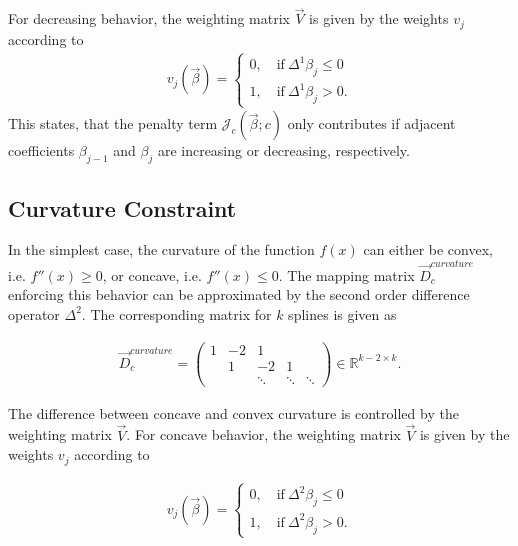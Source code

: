 \documentclass[10pt,a4paper]{article}
\begin{document}
	For decreasing behavior, the weighting matrix $\vec{V}$ is given by the weights $v_j$ according to
	\begin{align} \label{eq:v_monoton_dec}
		v_j(\vec{\beta}) = \begin{cases} 0, \quad \text{if} \ \Delta^1\beta_j \le 0 \\ 
						    					1, \quad \text{if} \ \Delta^1\beta_j > 0.
			\end{cases}	
	\end{align}
	This states, that the penalty term $\mathcal{J}_c(\vec{\beta}; c)$ only contributes if adjacent coefficients $\beta_{j-1}$ and $\beta_j$ are increasing or decreasing, respectively. \cite{hofner2011monotonicity} \cite{eilers2005unimodal}

	\subsection{Curvature Constraint}
	
	In the simplest case, the curvature of the function $f(x)$ can either be convex, i.e. $f''(x) \ge 0$, or concave, i.e. $f''(x) \le 0$. The mapping matrix $\vec{D}_c^{curvature}$ enforcing this behavior can be approximated by the second order difference operator $\Delta^2$. The corresponding matrix for $k$ splines is given as

	\begin{align} \label{eq:D_c_curvature}
		\vec{D}_c^{curvature} = \begin{pmatrix} 1 & -2 & 1 		&  		 & \\ 
														 & 1  &-2 	    &1 		 & \\
														 & 	  & \ddots  & \ddots & \ddots  
										\end{pmatrix} \in \mathbb{R}^{k-2 \times k}.
	\end{align}	
	
	The difference between concave and convex curvature is controlled by the weighting matrix $\vec{V}$. For concave behavior, the weighting matrix $\vec{V}$ is given by the weights $v_j$ according to
	
	\begin{align}\label{eq:v_curvature_concave}
		v_j(\vec{\beta}) = \begin{cases} 
										0, \quad \text{if} \ \Delta^2\beta_j \le 0 \\ 
										1, \quad \text{if} \ \Delta^2\beta_j > 0. 
								   \end{cases}
	\end{align}
	
\end{document}
